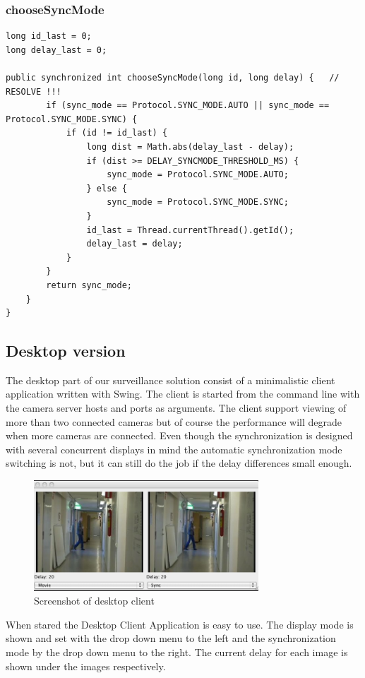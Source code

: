\documentclass[8pt,titlepage]{article}
\begin{document}
\subsubsection{chooseSyncMode}
\begin{verbatim}
long id_last = 0;
long delay_last = 0;	

public synchronized int chooseSyncMode(long id, long delay) {	// RESOLVE !!!		
		if (sync_mode == Protocol.SYNC_MODE.AUTO || sync_mode == Protocol.SYNC_MODE.SYNC) {
			if (id != id_last) {
				long dist = Math.abs(delay_last - delay);
				if (dist >= DELAY_SYNCMODE_THRESHOLD_MS) {
					sync_mode = Protocol.SYNC_MODE.AUTO;
				} else {
					sync_mode = Protocol.SYNC_MODE.SYNC;
				}
				id_last = Thread.currentThread().getId();
				delay_last = delay;		
			}
		}
		return sync_mode;
	}
}	
\end{verbatim}

\subsection{Desktop version}
The desktop part of our surveillance solution consist of a minimalistic client application written with Swing. The client is started from the command line with the camera server hosts and ports as arguments. The client support viewing of more than two connected cameras but of course the performance will degrade when more cameras are connected. Even though the synchronization is designed with several concurrent displays in mind the automatic synchronization mode switching is not, but it can still do the job if the delay differences small enough.

\begin{figure}[hbp]
\centering
\includegraphics[width=0.75\textwidth]{../screenshots/desktopclient.png}
\caption{Screenshot of desktop client}
\label{desktopclient}
\end{figure}

When stared the Desktop Client Application is easy to use. The display mode is shown and set with the drop down menu to the left and the synchronization mode by the drop down menu to the right. The current delay for each image is shown under the images respectively.
\end{document}
